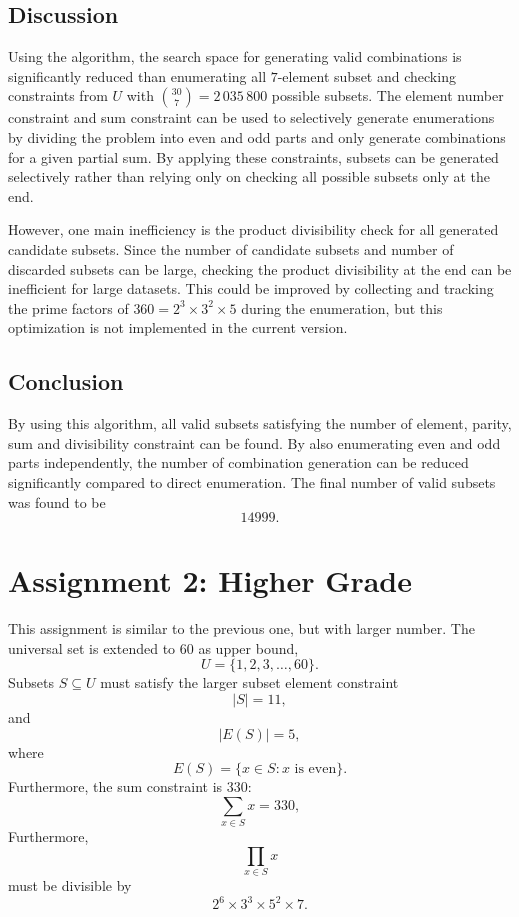 \documentclass[11pt,a4paper]{article}
\begin{document}
\subsection*{Discussion}

Using the algorithm, the search space for generating valid combinations is significantly reduced than enumerating all $7$-element subset and checking constraints from $U$ with $\binom{30}{7}=2\,035\,800$ possible subsets. The element number constraint and sum constraint can be used to selectively generate enumerations by dividing the problem into even and odd parts and only generate combinations for a given partial sum. By applying these constraints, subsets can be generated selectively rather than relying only on checking all possible subsets only at the end.

However, one main inefficiency is the product divisibility check for all generated candidate subsets. Since the number of candidate subsets and number of discarded subsets can be large, checking the product divisibility at the end can be inefficient for large datasets. This could be improved by collecting and tracking the prime factors of $360=2^3\times3^2\times5$ during the enumeration, but this optimization is not implemented in the current version.

\subsection*{Conclusion}

By using this algorithm, all valid subsets satisfying the number of element, parity, sum and divisibility constraint can be found. By also enumerating even and odd parts independently, the number of combination generation can be reduced significantly compared to direct enumeration. The final number of valid subsets was found to be \[ 14999. \]

\section*{Assignment 2: Higher Grade}

This assignment is similar to the previous one, but with larger number. The universal set is extended to $60$ as upper bound,
\[
U = \{1,2,3,\ldots,60\}.
\]
Subsets $S\subseteq U$ must satisfy the larger subset element constraint
\[
|S|=11,
\]
and
\[
|E(S)|=5,
\]
where
\[
E(S)=\{x\in S:x\text{ is even}\}.
\]
Furthermore, the sum constraint is 330:
\[
\sum_{x\in S}x=330,
\]
Furthermore,
\[
\prod_{x\in S}x
\]
must be divisible by
\[
2^6\times3^3\times5^2\times7.
\]
\end{document}
